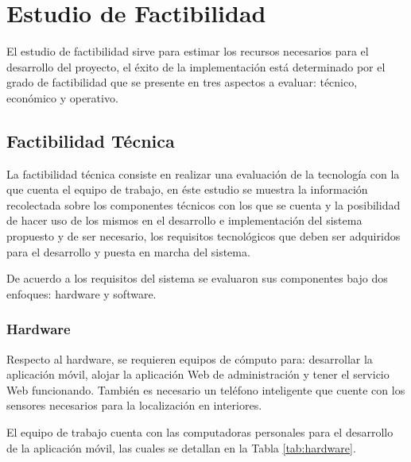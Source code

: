 \section{Estudio de Factibilidad}

\newcommand{\tabitem}{~~\llap{\textbullet}~~}

El estudio de factibilidad sirve para estimar los recursos necesarios para el desarrollo del proyecto, el éxito de la implementación está determinado por el grado de factibilidad que se presente en tres aspectos a evaluar: técnico, económico y operativo.

\subsection{Factibilidad Técnica}

La factibilidad técnica consiste en realizar una evaluación de la tecnología con la que cuenta el equipo de trabajo, en éste estudio se muestra la información recolectada sobre los componentes técnicos con los que se cuenta y la posibilidad de hacer uso de los mismos en el desarrollo e implementación del sistema propuesto y de ser necesario, los requisitos tecnológicos que deben ser adquiridos para el desarrollo y puesta en marcha del sistema. 

De acuerdo a los requisitos del sistema se evaluaron sus componentes bajo dos enfoques: hardware y software. 

\subsubsection{Hardware}

Respecto al hardware, se requieren equipos de cómputo para: desarrollar la aplicación móvil, alojar la aplicación Web de administración y tener el servicio Web funcionando. También es necesario un teléfono inteligente que cuente con los sensores necesarios para la localización en interiores. 

El equipo de trabajo cuenta con las computadoras personales para el desarrollo de la aplicación móvil, las cuales se detallan en la Tabla \ref{tab:hardware}.

